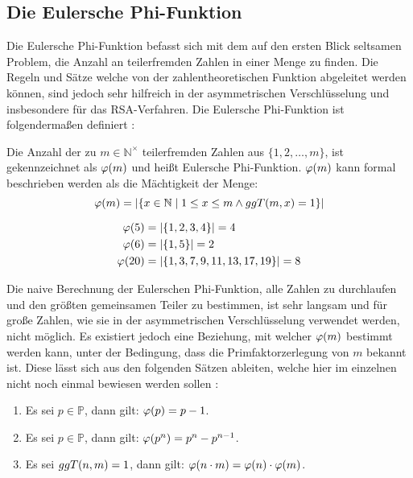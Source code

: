 \subsection{Die Eulersche Phi-Funktion}
Die Eulersche Phi-Funktion befasst sich mit dem auf den ersten Blick seltsamen
Problem, die Anzahl an teilerfremden Zahlen in einer Menge zu finden. Die Regeln
und Sätze welche von der zahlentheoretischen Funktion abgeleitet werden können, sind jedoch sehr
hilfreich in der asymmetrischen Verschlüsselung und insbesondere für das
RSA-Verfahren. Die Eulersche Phi-Funktion ist folgendermaßen definiert
\parencite[165]{BOOK:crypto} \parencite{SITE:phi-euler-fermat}:

\begin{definition}
  Die Anzahl der zu $m \in \mathbb{N}^\times$ teilerfremden Zahlen aus $\{1,2,\dots,m\}$,
  ist gekennzeichnet als $\varphi(m)$ und heißt Eulersche Phi-Funktion. $\varphi(m)$
  kann formal beschrieben werden als die Mächtigkeit der Menge:
  \begin{equation*}
    \varphi(m) = \vert \{x \in \mathbb{N} \mid 1 \leq x \leq m \wedge ggT(m,x) = 1 \} \vert
  \end{equation*}
\end{definition}

\begin{example}
  \begin{align*}
    \varphi(5)  & = \vert \{1,2,3,4\} \vert = 4             \\
    \varphi(6)  & = \vert \{1,5\} \vert = 2                 \\
    \varphi(20) & = \vert \{1,3,7,9,11,13,17,19\} \vert = 8
  \end{align*}
\end{example}

\noindent
Die naive Berechnung der Eulerschen Phi-Funktion, alle Zahlen zu durchlaufen und den
größten gemeinsamen Teiler zu bestimmen, ist sehr langsam und für große Zahlen, wie sie
in der asymmetrischen Verschlüsselung verwendet werden, nicht möglich. Es existiert jedoch
eine Beziehung, mit welcher $\varphi(m)$ bestimmt werden kann, unter der
Bedingung, dass die Primfaktorzerlegung von $m$ bekannt ist. Diese lässt sich aus
den folgenden Sätzen ableiten, welche hier im einzelnen nicht noch einmal bewiesen werden
sollen \parencite{SITE:phi-euler-fermat}:
\begin{enumerate}[ref=(\arabic*)]
  \item Es sei $p \in \mathbb{P}$, dann gilt: $\varphi(p) = p - 1$. \label{enum:phi1}
  \item Es sei $p \in \mathbb{P}$, dann gilt: $\varphi(p^n) = p^n - p^{n-1}$. \label{enum:phi2}
  \item Es sei $ggT(n,m) = 1$, dann gilt:
        $\varphi(n \cdot m) = \varphi(n) \cdot \varphi(m)$. \label{enum:phi3}
\end{enumerate}

